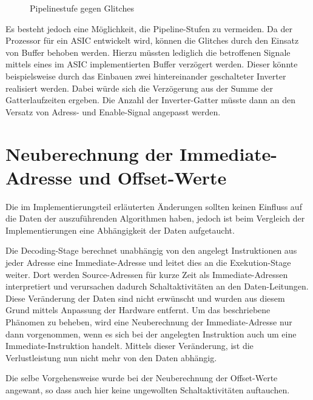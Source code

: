 \begin{figure}[H] 
	\centering
	
	\caption{Pipelinestufe gegen Glitches}
	\label{fig:glitches_pipeline}
\end{figure}


Es besteht jedoch eine Möglichkeit, die Pipeline-Stufen zu vermeiden.
Da der Prozessor für ein ASIC entwickelt wird, können die Glitches durch den Einsatz von Buffer behoben werden. Hierzu müssten lediglich die betroffenen Signale mittels eines im ASIC implementierten Buffer verzögert werden. Dieser könnte beispielsweise durch das Einbauen zwei hintereinander geschalteter Inverter realisiert werden. Dabei würde sich die Verzögerung aus der Summe der Gatterlaufzeiten ergeben. Die Anzahl der Inverter-Gatter müsste dann an den Versatz von Adress- und Enable-Signal angepasst werden. 

\section{Neuberechnung der Immediate-Adresse und Offset-Werte}
Die im Implementierungsteil erläuterten Änderungen sollten keinen Einfluss auf die Daten der auszuführenden Algorithmen haben, jedoch ist beim Vergleich der Implementierungen eine Abhängigkeit der Daten aufgetaucht.

Die Decoding-Stage berechnet unabhängig von den angelegt Instruktionen aus jeder Adresse eine Immediate-Adresse und leitet dies an die Exekution-Stage weiter. Dort werden Source-Adressen für kurze Zeit als Immediate-Adressen interpretiert und verursachen dadurch Schaltaktivitäten an den Daten-Leitungen. Diese Veränderung der Daten sind nicht erwünscht und wurden aus diesem Grund mittels Anpassung der Hardware entfernt. Um das beschriebene Phänomen zu beheben,  wird eine Neuberechnung der Immediate-Adresse nur dann vorgenommen, wenn es sich bei der angelegten Instruktion auch um eine Immediate-Instruktion handelt.
Mittels dieser Veränderung, ist die Verlustleistung nun nicht mehr von den Daten abhängig.

Die selbe Vorgehensweise wurde bei der Neuberechnung der Offset-Werte angewant, so dass auch hier keine ungewollten Schaltaktivitäten auftauchen.



